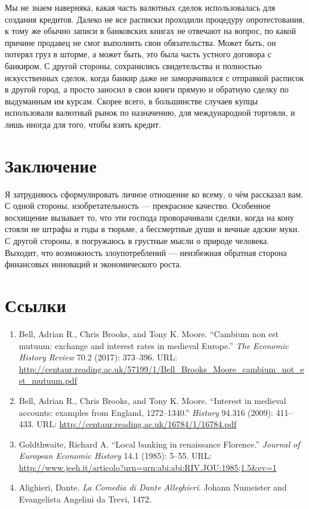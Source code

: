 \documentclass[a4paper,14pt]{extarticle}
\begin{document}
Мы не знаем наверняка, какая часть валютных сделок использовалась для создания кредитов. Далеко не все расписки проходили процедуру опротестования, к тому же обычно записи в банковских книгах не отвечают на вопрос, по какой причине продавец не смог выполнить свои обязательства. Может быть, он потерял груз в шторме, а может быть, это была часть устного договора с банкиром. С другой стороны, сохранились свидетельства и полностью искусственных сделок, когда банкир даже не заморачивался с отправкой расписок в другой город, а просто заносил в свои книги прямую и обратную сделку по выдуманным им курсам. Скорее всего, в большинстве случаев купцы использовали валютный рынок по назначению, для международной торговли, и лишь иногда для того, чтобы взять кредит.

\section*{Заключение}
Я затрудняюсь сформулировать личное отношение ко всему, о чём рассказал вам. С одной стороны, изобретательность --- прекрасное качество. Особенное восхищение вызывает то, что эти господа проворачивали сделки, когда на кону стояли не штрафы и годы в тюрьме, а бессмертные души и вечные адские муки. С другой стороны, я погружаюсь в грустные мысли о природе человека. Выходит, что возможность злоупотреблений --- неизбежная обратная сторона финансовых инноваций и экономического роста.

\section*{Ссылки}

\begin{enumerate}[leftmargin=*]
\item Bell, Adrian R., Chris Brooks, and Tony K. Moore. ``Cambium non est mutuum: exchange and interest rates in medieval Europe.'' \textit{The Economic History Review} 70.2 (2017): 373--396. URL: \url{http://centaur.reading.ac.uk/57199/1/Bell_Brooks_Moore_cambium_not_est_mutuum.pdf}

\item Bell, Adrian R., Chris Brooks, and Tony K. Moore. ``Interest in medieval accounts: examples from England, 1272–1340.'' \textit{History} 94.316 (2009): 411--433. URL: \url{http://centaur.reading.ac.uk/16784/1/16784.pdf}

\item Goldthwaite, Richard A. ``Local banking in renaissance Florence.'' \textit{Journal of European Economic History} 14.1 (1985): 5--55. URL: \url{http://www.jeeh.it/articolo?urn=urn:abi:abi:RIV.JOU:1985;1.5&ev=1}

\item Alighieri, Dante. \textit{La Comedia di Dante Alleghieri}. Johann Numeister and Evangelista Angelini da Trevi, 1472.
\end{enumerate}
\end{document}
